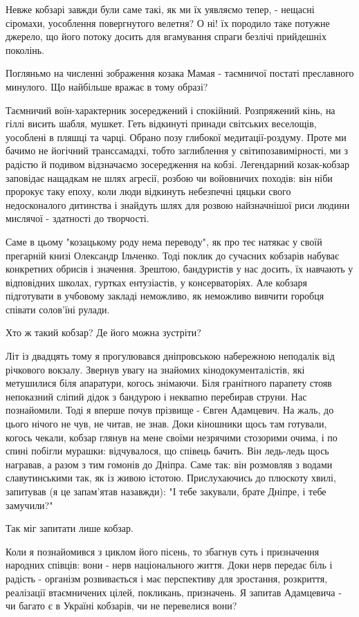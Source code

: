 Невже кобзарі завжди були саме такі, як ми їх уявляємо тепер, - нещасні
сіромахи, уособлення повергнутого велетня? О ні! їх породило таке потужне
джерело, що його потоку досить для вгамування спраги безлічі прийдешніх
поколінь.

Погляньмо на численні зображення козака Мамая - таємничої постаті преславного
минулого. Що найбільше вражає в тому образі?

Таємничий воїн-характерник зосереджений і спокійний. Розпряжений кінь, на гіллі
висить шабля, мушкет. Геть відкинуті принади світських веселощів, уособлені в
пляшці та чарці. Обрано позу глибокої медитації-роздуму. Проте ми бачимо не
йогічний транссамадхі, тобто заглиблення у світипозавимірності, ми з радістю й
подивом відзначаємо зосередження на кобзі. Легендарний козак-кобзар заповідає
нащадкам не шлях агресії, розбою чи войовничих походів: він ніби пророкує таку
епоху, коли люди відкинуть небезпечні цяцьки свого недосконалого дитинства і
знайдуть шлях для розвою найзначнішої риси людини мислячої - здатності до
творчості.

Саме в цьому "козацькому роду нема переводу", як про теє натякає у своїй
прегарній книзі Олександр Ільченко. Тоді поклик до сучасних кобзарів набуває
конкретних обрисів і значення. Зрештою, бандуристів у нас досить, їх навчають у
відповідних школах, гуртках ентузіастів, у консерваторіях. Але кобзаря
підготувати в учбовому закладі неможливо, як неможливо вивчити горобця співати
солов'їні рулади.

Хто ж такий кобзар? Де його можна зустріти?

Літ із двадцять тому я прогулювався дніпровською набережною неподалік від
річкового вокзалу. Звернув увагу на знайомих кінодокументалістів, які
метушилися біля апаратури, когось знімаючи. Біля гранітного парапету стояв
непоказний сліпий дідок з бандурою і неквапно перебирав струни. Нас
познайомили. Тоді я вперше почув прізвище - Євген Адамцевич. На жаль, до цього
нічого не чув, не читав, не знав. Доки кіношники щось там готували, когось
чекали, кобзар глянув на мене своїми незрячими стозорими очима, і по спині
побігли мурашки: відчувалося, що співець бачить. Він ледь-ледь щось награвав, а
разом з тим гомонів до Дніпра. Саме так: він розмовляв з водами славутинськими
так, як із живою істотою. Прислухаючись до плюскоту хвилі, запитував (я це
запам'ятав назавжди): "І тебе закували, брате Дніпре, і тебе замучили?"

Так міг запитати лише кобзар.

Коли я познайомився з циклом його пісень, то збагнув суть і призначення народних співців: вони - нерв національного життя. Доки нерв передає біль і радість - організм розвивається і має перспективу для зростання, розкриття, реалізації втаємничених цілей, покликань, призначень. Я запитав Адамцевича - чи багато є в Україні кобзарів, чи не перевелися вони?

